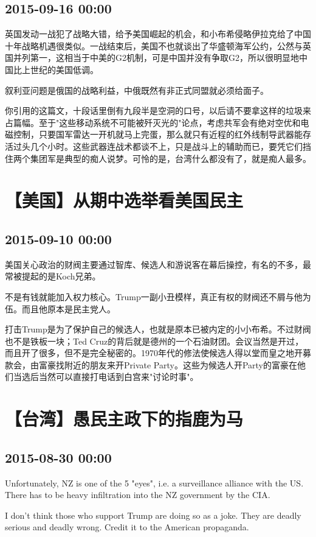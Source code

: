 \documentclass[twocolumn]{ctexart}
\begin{document}
\subsection*{2015-09-16 00:00}
英国发动一战犯了战略大错，给予美国崛起的机会，和小布希侵略伊拉克给了中国十年战略机遇很类似。一战结束后，美国不也就谈出了华盛顿海军公约，公然与英国并列第一，这相当于中美的G2机制，可是中国并没有争取G2，所以很明显地中国比上世纪的美国低调。

叙利亚问题是俄国的战略利益，中俄既然有非正式同盟就必须给面子。

你引用的这篇文，十段话里倒有九段半是空洞的口号，以后请不要拿这样的垃圾来占篇幅。至于"这些移动系统不可能被歼灭光的"论点，考虑共军会有绝对空优和电磁控制，只要国军雷达一开机就马上完蛋，那么就只有近程的红外线制导武器能存活过头几个小时。这些武器连战术都谈不上，只是战斗上的辅助而已，要凭它们挡住两个集团军是典型的痴人说梦。可怜的是，台湾什么都没有了，就是痴人最多。\section*{【美国】从期中选举看美国民主}
\subsection*{2015-09-10 00:00}
美国关心政治的财阀主要通过智库、候选人和游说客在幕后操控，有名的不多，最常被提起的是Koch兄弟。

不是有钱就能加入权力核心。Trump一副小丑模样，真正有权的财阀还不屑与他为伍。而且他原本是民主党人。

打击Trump是为了保护自己的候选人，也就是原本已被内定的小小布希。不过财阀也不是铁板一块；Ted Cruz的背后就是德州的一个石油财团。会议当然是开过，而且开了很多，但不是完全秘密的。1970年代的修法使候选人得以堂而皇之地开募款会，由富豪找附近的朋友来开Private Party。这些为候选人开Party的富豪在他们当选后当然可以直接打电话到白宫来"讨论时事"。\section*{【台湾】愚民主政下的指鹿为马}
\subsection*{2015-08-30 00:00}
Unfortunately, NZ is one of the 5 "eyes", i.e. a surveillance alliance with the US. There has to be heavy infiltration into the NZ government by the CIA.

I don't think those who support Trump are doing so as a joke. They are deadly serious and deadly wrong. Credit it to the American propaganda.
\end{document}
